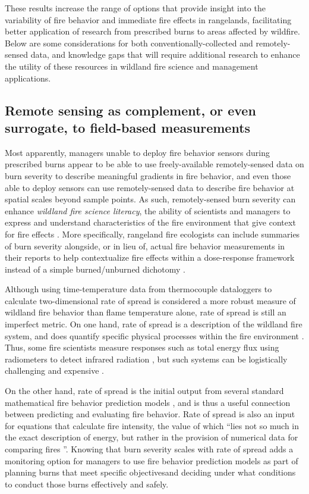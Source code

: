 \documentclass[fire,article,submit,oneauthor,pdftex]{Definitions/mdpi}
\begin{document}
These results increase the range of options that provide insight into the variability of fire behavior and immediate fire effects in rangelands, facilitating better application of research from prescribed burns to areas affected by wildfire. 
Below are some considerations for both conventionally-collected and remotely-sensed data, and knowledge gaps that will require additional research to enhance the utility of these resources in wildland fire science and management applications.

\subsection{Remote sensing as complement, or even surrogate, to field-based measurements} 

Most apparently, managers unable to deploy fire behavior sensors during prescribed burns appear to be able to use freely-available remotely-sensed data on burn severity to describe meaningful gradients in fire behavior, and even those able to deploy sensors can use remotely-sensed data to describe fire behavior at  spatial scales beyond sample points. 
As such, remotely-sensed burn severity can enhance \emph{wildland fire science literacy}, the ability of scientists and managers to express and understand characteristics of the fire environment that give context for fire effects \cite{mcgranahan2018, mcgranahan2022a}. 
More specifically, rangeland fire ecologists can include summaries of burn severity alongside, or in lieu of, actual fire behavior measurements in their reports to help contextualize fire effects within a dose-response framework instead of a simple burned/unburned dichotomy \cite{smith2016a}. 

Although using time-temperature data from thermocouple dataloggers to calculate two-dimensional rate of spread is considered a more robust measure of wildland fire behavior than flame temperature alone, rate of spread is still an imperfect metric.
On one hand, rate of spread is a description of the wildland fire system, and does quantify specific physical processes within the fire environment \cite{finney2021}. 
Thus, some fire scientists measure responses such as total energy flux using radiometers to detect infrared radiation \cite{butler2004, kremens2012, obrien2018}, but such systems can be logistically challenging and expensive \cite{butler2010}. 

On the other hand, rate of spread is the initial output from several standard mathematical fire behavior prediction models \cite{rothermel1972,noble1980}, and is thus a useful connection between predicting and evaluating fire behavior. 
Rate of spread is also an input for equations that calculate fire intensity, the value of which ``lies not so much in the exact description of energy, but rather in the provision of numerical data for comparing fires \cite[][p. 354]{alexander1982}''. 
Knowing that burn severity scales with rate of spread adds a monitoring option for managers to use fire behavior prediction models as part of planning burns that meet specific objectives\textemdash and deciding under what conditions to conduct those burns effectively and safely. 
\end{document}
